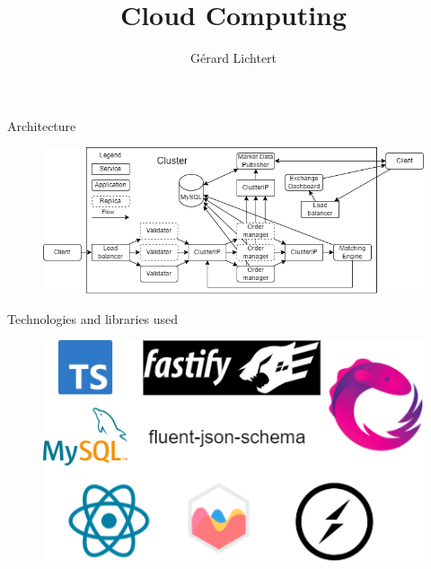 \documentclass{beamer}
\title{Cloud Computing}
\author{Gérard Lichtert}
\begin{document}
\frame{\maketitle} %
\begin{frame}{Architecture}
	\begin{figure}
		\includegraphics[width=\textwidth]{architecture.drawio.png}
	\end{figure}
\end{frame}
\begin{frame}{Technologies and libraries used}
	\begin{figure}
		\includegraphics[width=\textwidth]{technologies.drawio.png}
	\end{figure}
\end{frame}
\end{document}
